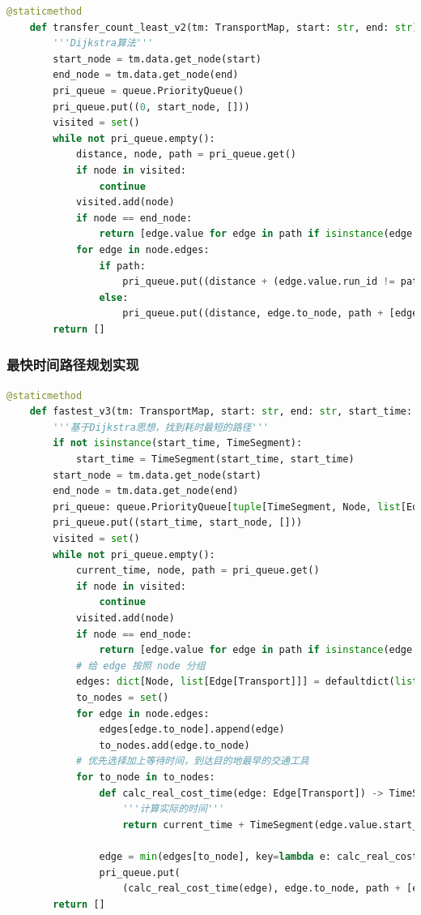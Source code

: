 \documentclass[10pt]{article}
\begin{document}
    \begin{lstlisting}[language=Python]
    @staticmethod
    def transfer_count_least_v2(tm: TransportMap, start: str, end: str) -> list[Transport]:
        '''Dijkstra算法'''
        start_node = tm.data.get_node(start)
        end_node = tm.data.get_node(end)
        pri_queue = queue.PriorityQueue()
        pri_queue.put((0, start_node, []))
        visited = set()
        while not pri_queue.empty():
            distance, node, path = pri_queue.get()
            if node in visited:
                continue
            visited.add(node)
            if node == end_node:
                return [edge.value for edge in path if isinstance(edge.value, Transport)]
            for edge in node.edges:
                if path:
                    pri_queue.put((distance + (edge.value.run_id != path[-1].value.run_id), edge.to_node, path + [edge]))
                else:
                    pri_queue.put((distance, edge.to_node, path + [edge]))
        return []
    \end{lstlisting}

    \subsubsection{最快时间路径规划实现}
    \begin{lstlisting}[language=Python]
    @staticmethod
    def fastest_v3(tm: TransportMap, start: str, end: str, start_time: int | str | TimeSegment) -> list[Transport]:
        '''基于Dijkstra思想，找到耗时最短的路径'''
        if not isinstance(start_time, TimeSegment):
            start_time = TimeSegment(start_time, start_time)
        start_node = tm.data.get_node(start)
        end_node = tm.data.get_node(end)
        pri_queue: queue.PriorityQueue[tuple[TimeSegment, Node, list[Edge[Transport]]]] = queue.PriorityQueue()
        pri_queue.put((start_time, start_node, []))
        visited = set()
        while not pri_queue.empty():
            current_time, node, path = pri_queue.get()
            if node in visited:
                continue
            visited.add(node)
            if node == end_node:
                return [edge.value for edge in path if isinstance(edge.value, Transport)]
            # 给 edge 按照 node 分组
            edges: dict[Node, list[Edge[Transport]]] = defaultdict(list[Edge[Transport]])
            to_nodes = set()
            for edge in node.edges:
                edges[edge.to_node].append(edge)
                to_nodes.add(edge.to_node)
            # 优先选择加上等待时间，到达目的地最早的交通工具
            for to_node in to_nodes:
                def calc_real_cost_time(edge: Edge[Transport]) -> TimeSegment:
                    '''计算实际的时间'''
                    return current_time + TimeSegment(edge.value.start_time, edge.value.end_time)

                edge = min(edges[to_node], key=lambda e: calc_real_cost_time(e))
                pri_queue.put(
                    (calc_real_cost_time(edge), edge.to_node, path + [edge]))
        return []
    \end{lstlisting}
\end{document}
